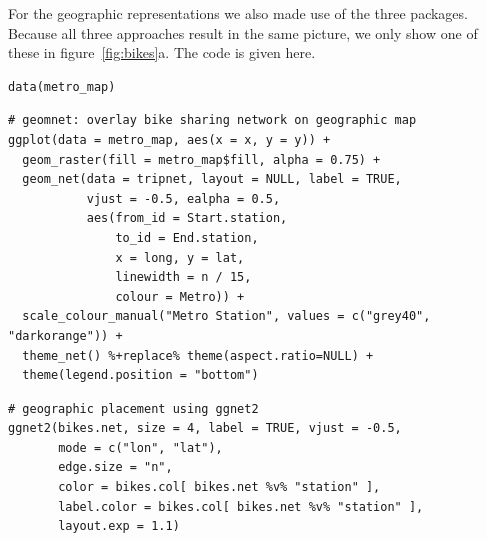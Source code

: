For the geographic representations we also made use of the three packages. Because all three approaches result in the same picture, we only show one of these in figure~\ref{fig:bikes}a. The code is given here.

\begin{knitrout}
\color{fgcolor}\begin{kframe}
\begin{verbatim}
data(metro_map)
\end{verbatim}
\end{kframe}
\end{knitrout}
%
\begin{knitrout}
\color{fgcolor}\begin{kframe}
\begin{verbatim}
# geomnet: overlay bike sharing network on geographic map
ggplot(data = metro_map, aes(x = x, y = y)) +
  geom_raster(fill = metro_map$fill, alpha = 0.75) +
  geom_net(data = tripnet, layout = NULL, label = TRUE,
           vjust = -0.5, ealpha = 0.5,
           aes(from_id = Start.station,
               to_id = End.station,
               x = long, y = lat,
               linewidth = n / 15,
               colour = Metro)) +
  scale_colour_manual("Metro Station", values = c("grey40", "darkorange")) +
  theme_net() %+replace% theme(aspect.ratio=NULL) +
  theme(legend.position = "bottom")
\end{verbatim}
\end{kframe}
\end{knitrout}
\begin{knitrout}
\color{fgcolor}\begin{kframe}
\begin{verbatim}
# geographic placement using ggnet2
ggnet2(bikes.net, size = 4, label = TRUE, vjust = -0.5,
       mode = c("lon", "lat"),
       edge.size = "n",
       color = bikes.col[ bikes.net %v% "station" ],
       label.color = bikes.col[ bikes.net %v% "station" ],
       layout.exp = 1.1)
\end{verbatim}
\end{kframe}
\end{knitrout}

